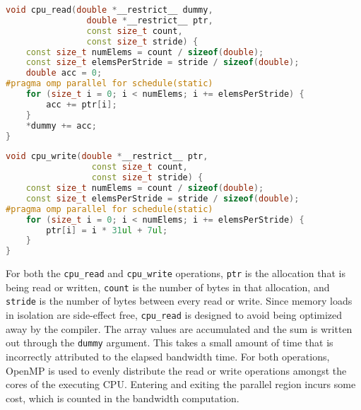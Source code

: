 \begin{lstlisting}[language=C++, caption=CPU-CPU Read Function, label=lst:explicit-cpu-cpu-cpuread]
void cpu_read(double *__restrict__ dummy,
                double *__restrict__ ptr,
                const size_t count,
                const size_t stride) {
    const size_t numElems = count / sizeof(double);
    const size_t elemsPerStride = stride / sizeof(double);
    double acc = 0;
#pragma omp parallel for schedule(static)
    for (size_t i = 0; i < numElems; i += elemsPerStride) {
        acc += ptr[i];
    }
    *dummy += acc;
}
\end{lstlisting}


\begin{lstlisting}[language=C++, caption=CPU-CPU Write Function, label=lst:explicit-cpu-cpu-cpuwrite]
void cpu_write(double *__restrict__ ptr, 
                 const size_t count, 
                 const size_t stride) {
    const size_t numElems = count / sizeof(double);
    const size_t elemsPerStride = stride / sizeof(double);
#pragma omp parallel for schedule(static)
    for (size_t i = 0; i < numElems; i += elemsPerStride) {
        ptr[i] = i * 31ul + 7ul;
    }
}
\end{lstlisting}

For both the \texttt{cpu\_read} and \texttt{cpu\_write} operations, \texttt{ptr} is the allocation that is being read or written,
\texttt{count} is the number of bytes in that allocation, and \texttt{stride} is the number of bytes between every read or write.
Since memory loads in isolation are side-effect free, \texttt{cpu\_read} is designed to avoid being optimized away by the compiler.
The array values are accumulated and the sum is written out through the \texttt{dummy} argument.
This takes a small amount of time that is incorrectly attributed to the elapsed bandwidth time.
For both operations, OpenMP is used to evenly distribute the read or write operations amongst the cores of the executing CPU.
Entering and exiting the parallel region incurs some cost, which is counted in the bandwidth computation.

